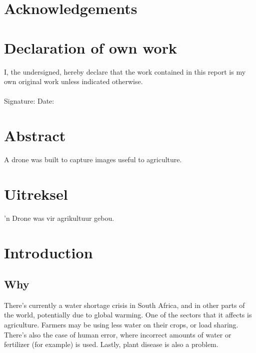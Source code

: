 \newpage
\section*{Acknowledgements}
\section*{Declaration of own work}

I, the undersigned, hereby declare that the work contained in this report is my own original work
unless indicated otherwise.\\\\

\noindent
Signature: \underline{ }\underline{ }\underline{ } Date: \underline{ }\underline{ }\underline{ }

\section*{Abstract}

A drone was built to capture images useful to agriculture.

\section*{Uitreksel}

'n Drone was vir agrikultuur gebou.

\tableofcontents
\listoffigures
\listoftables

\newpage


\section{Introduction}

\subsection{Why}

There's currently a water shortage crisis in South Africa, and in other parts of the world, potentially due to global warming. One of the sectors that it affects is agriculture. Farmers may be using less water on their crops, or load sharing. There's also the case of human error, where incorrect amounts of water or fertilizer (for example) is used. Lastly, plant disease is also a problem.\\

